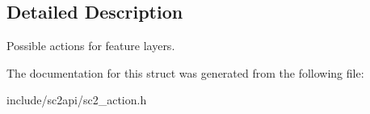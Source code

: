 \subsection{Detailed Description}
Possible actions for feature layers. 

The documentation for this struct was generated from the following file\+:\begin{DoxyCompactItemize}
\item 
include/sc2api/sc2\+\_\+action.\+h\end{DoxyCompactItemize}
